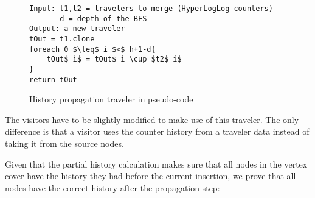 \begin{figure}[h]
    \begin{lstlisting}[mathescape]
Input: t1,t2 = travelers to merge (HyperLogLog counters)
       d = depth of the BFS
Output: a new traveler
tOut = t1.clone
foreach 0 $\leq$ i $<$ h+1-d{
    tOut$_i$ = tOut$_i \cup $t2$_i$
}
return tOut
    \end{lstlisting}
    \caption{History propagation traveler in pseudo-code}
    \label{fig:history_propagation_traveler}
\end{figure}

The visitors have to be slightly modified to make use of this traveler. The only difference is that a visitor uses the counter history from a traveler data instead of taking it from the source nodes.

Given that the partial history calculation makes sure that all nodes in the vertex cover have the history they had before the current insertion, we prove that all nodes  have the correct history after the propagation step: \\

